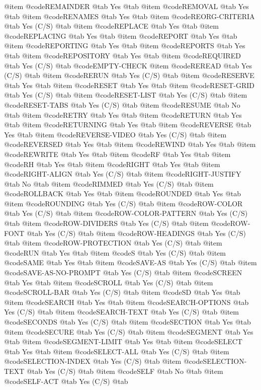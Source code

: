 @item @code{REMAINDER} @tab Yes @tab 
@item @code{REMOVAL} @tab Yes @tab 
@item @code{RENAMES} @tab Yes @tab 
@item @code{REORG-CRITERIA} @tab Yes	(C/S) @tab 
@item @code{REPLACE} @tab Yes @tab 
@item @code{REPLACING} @tab Yes @tab 
@item @code{REPORT} @tab Yes @tab 
@item @code{REPORTING} @tab Yes @tab 
@item @code{REPORTS} @tab Yes @tab 
@item @code{REPOSITORY} @tab Yes @tab 
@item @code{REQUIRED} @tab Yes	(C/S) @tab @code{EMPTY-CHECK}
@item @code{REREAD} @tab Yes	(C/S) @tab 
@item @code{RERUN} @tab Yes	(C/S) @tab 
@item @code{RESERVE} @tab Yes @tab 
@item @code{RESET} @tab Yes @tab 
@item @code{RESET-GRID} @tab Yes	(C/S) @tab 
@item @code{RESET-LIST} @tab Yes	(C/S) @tab 
@item @code{RESET-TABS} @tab Yes	(C/S) @tab 
@item @code{RESUME} @tab No @tab 
@item @code{RETRY} @tab Yes @tab 
@item @code{RETURN} @tab Yes @tab 
@item @code{RETURNING} @tab Yes @tab 
@item @code{REVERSE} @tab Yes @tab 
@item @code{REVERSE-VIDEO} @tab Yes	(C/S) @tab 
@item @code{REVERSED} @tab Yes @tab 
@item @code{REWIND} @tab Yes @tab 
@item @code{REWRITE} @tab Yes @tab 
@item @code{RF} @tab Yes @tab 
@item @code{RH} @tab Yes @tab 
@item @code{RIGHT} @tab Yes @tab 
@item @code{RIGHT-ALIGN} @tab Yes	(C/S) @tab 
@item @code{RIGHT-JUSTIFY} @tab No @tab 
@item @code{RIMMED} @tab Yes	(C/S) @tab 
@item @code{ROLLBACK} @tab Yes @tab 
@item @code{ROUNDED} @tab Yes @tab 
@item @code{ROUNDING} @tab Yes	(C/S) @tab 
@item @code{ROW-COLOR} @tab Yes	(C/S) @tab 
@item @code{ROW-COLOR-PATTERN} @tab Yes	(C/S) @tab 
@item @code{ROW-DIVIDERS} @tab Yes	(C/S) @tab 
@item @code{ROW-FONT} @tab Yes	(C/S) @tab 
@item @code{ROW-HEADINGS} @tab Yes	(C/S) @tab 
@item @code{ROW-PROTECTION} @tab Yes	(C/S) @tab 
@item @code{RUN} @tab Yes @tab 
@item @code{S} @tab Yes	(C/S) @tab 
@item @code{SAME} @tab Yes @tab 
@item @code{SAVE-AS} @tab Yes	(C/S) @tab 
@item @code{SAVE-AS-NO-PROMPT} @tab Yes	(C/S) @tab 
@item @code{SCREEN} @tab Yes @tab 
@item @code{SCROLL} @tab Yes	(C/S) @tab 
@item @code{SCROLL-BAR} @tab Yes	(C/S) @tab 
@item @code{SD} @tab Yes @tab 
@item @code{SEARCH} @tab Yes @tab 
@item @code{SEARCH-OPTIONS} @tab Yes	(C/S) @tab 
@item @code{SEARCH-TEXT} @tab Yes	(C/S) @tab 
@item @code{SECONDS} @tab Yes	(C/S) @tab 
@item @code{SECTION} @tab Yes @tab 
@item @code{SECURE} @tab Yes	(C/S) @tab 
@item @code{SEGMENT} @tab Yes @tab 
@item @code{SEGMENT-LIMIT} @tab Yes @tab 
@item @code{SELECT} @tab Yes @tab 
@item @code{SELECT-ALL} @tab Yes	(C/S) @tab 
@item @code{SELECTION-INDEX} @tab Yes	(C/S) @tab 
@item @code{SELECTION-TEXT} @tab Yes	(C/S) @tab 
@item @code{SELF} @tab No @tab 
@item @code{SELF-ACT} @tab Yes	(C/S) @tab 

